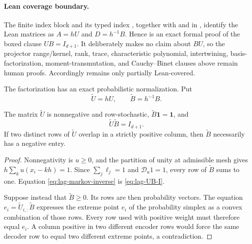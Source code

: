 \paragraph{Lean coverage boundary.}
The finite index block  and its typed index
, together with
 and
 in
, identify the Lean matrices as
$A=hU$ and $D=h^{-1}B$.  Hence
 is an exact formal proof
of the boxed clause $UB=I_{d+1}$.  It deliberately makes no claim about
$BU$, so the projector range/kernel, rank, trace, characteristic polynomial,
intertwining, basis-factorization, moment-transmutation, and Cauchy--Binet
clauses above remain human proofs.  Accordingly
 remains only partially Lean-covered.

The factorization has an exact probabilistic normalization.  Put
\[
 \widetilde U=hU,
 \qquad
 \widetilde B=h^{-1}B.
\]

\begin{proposition}
\label{prop:lag-markov}
The matrix $\widetilde U$ is nonnegative and row-stochastic,
$\widetilde B\bm1=\bm1$, and
\begin{equation}
 \widetilde U\widetilde B=I_{d+1}.
 \label{eq:lag-markov-inverse}
\end{equation}
If two distinct rows of $\widetilde U$ overlap in a strictly positive column,
then $\widetilde B$ necessarily has a negative entry.
\end{proposition}

\begin{proof}
Nonnegativity is $u\ge0$, and the partition of unity at admissible mesh gives
$h\sum_ku(x_i-kh)=1$.  Since $\sum_j\ell_j=1$ and
$\mathscr D_u1=1$, every row of $\widetilde B$ sums to one.
Equation \eqref{eq:lag-markov-inverse} is \eqref{eq:lag-UB-I}.

Suppose instead that $\widetilde B\ge0$.  Its rows are then probability
vectors.  The equation
$e_i=\widetilde U_{i,:}\widetilde B$ expresses the extreme point $e_i$ of
the probability simplex as a convex combination of those rows.  Every row
used with positive weight must therefore equal $e_i$.  A column positive in
two different encoder rows would force the same decoder row to equal two
different extreme points, a contradiction.
\end{proof}

